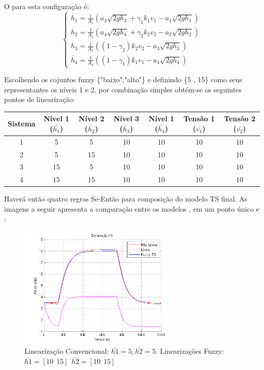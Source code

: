 O  para esta configuração é:
\begin{equation}
\begin{cases}
\dot{h_{1}} = \frac{1}{A_{1}}(a_{3}\sqrt{2gh_{3}} + \gamma_{1}k_{1}v_{1} - a_{1}\sqrt{2gh_{1}})\\

\dot{h_{2}} = \frac{1}{A_{2}}(a_{4}\sqrt{2gh_{4}} + \gamma_{2}k_{2}v_{2} - a_{2}\sqrt{2gh_{2}})\\

\dot{h_{3}} = \frac{1}{A_{3}}((1 - \gamma_{2})k_{2}v_{2} - a_{3}\sqrt{2gh_{3}})\\

\dot{h_{4}} = \frac{1}{A_{4}}((1 - \gamma_{1})k_{1}v_{1} - a_{4}\sqrt{2gh_{4}})
\end{cases}
\label{eqFMNL}
\end{equation}

Escolhendo os cojuntos fuzzy \{"baixo","alto"\} e definindo \{5 , 15\} como seus representantes os níveis 1 e 2, por combinação simples obtém-se os seguintes pontos de linearização:
\begin{center}
	\begin{tabular}{|c|c|c|c|c|c|c|}
		\hline
		Sistema & Nível 1 ($\bar{h_1}$) & Nível 2 ($\bar{h_2}$) & Nível 3 ($\bar{h_3}$) & Nível 1 ($\bar{h_4}$) & Tensão 1 ($\bar{v_1}$) & Tensão 2 ($\bar{v_2}$) \\ \hline
		1 & 5 & 5 & 10 & 10 & 10 & 10 \\ \hline
		2 & 5 & 15 & 10 & 10 & 10 & 10 \\ \hline
		3 & 15 & 5 & 10 & 10 & 10 & 10 \\ \hline
		4 & 15 & 15 & 10 & 10 & 10 & 10 \\	\hline
	\end{tabular}
\end{center}

Haverá então quatro regras Se-Então para composição do modelo TS final. As imagens a seguir apresenta a comparação entre os modelos ,  em um ponto único e :

\begin{figure}[H]
	\centering
	\includegraphics[width=0.7\textwidth]{img/FM_h1_5_10_15.png}
	\caption{\small Linearização Convencional: $ \bar{h1}=5, \bar{h2}=5$. Linearizações Fuzzy: $\bar{h1}=[10 \ \ 15] \ \ \bar{h2}=[10 \ \ 15]$ }
	\label{figH1TS2}
\end{figure}


